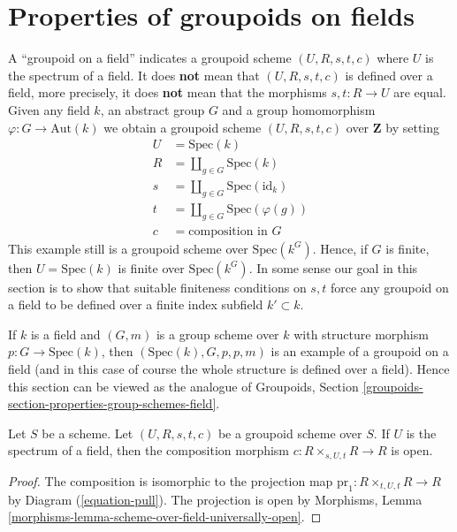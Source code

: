 \section{Properties of groupoids on fields}
\label{section-properties-groupoids-on-fields}

\noindent
A ``groupoid on a field'' indicates a groupoid scheme $(U, R, s, t, c)$
where $U$ is the spectrum of a field. It does {\bf not} mean that
$(U, R, s, t, c)$ is defined over a field, more precisely, it does
{\bf not} mean that the morphisms $s, t : R \to U$ are equal.
Given any field $k$, an abstract group $G$ and a group homomorphism
$\varphi : G \to \text{Aut}(k)$ we obtain a groupoid scheme
$(U, R, s, t, c)$ over $\mathbf{Z}$ by setting
\begin{align*}
U & = \text{Spec}(k) \\
R & = \coprod\nolimits_{g \in G} \text{Spec}(k) \\
s & = \coprod\nolimits_{g \in G} \text{Spec}(\text{id}_k) \\
t & = \coprod\nolimits_{g \in G} \text{Spec}(\varphi(g)) \\
c & = \text{composition in }G
\end{align*}
This example still is a groupoid scheme over $\text{Spec}(k^G)$.
Hence, if $G$ is finite, then $U = \text{Spec}(k)$ is finite over
$\text{Spec}(k^G)$.
In some sense our goal in this section is to show that suitable
finiteness conditions on $s, t$ force any groupoid on a field
to be defined over a finite index subfield $k' \subset k$.

\medskip\noindent
If $k$ is a field and $(G, m)$ is a group scheme over $k$ with structure
morphism $p : G \to \text{Spec}(k)$, then $(\text{Spec}(k), G, p, p, m)$
is an example of a groupoid on a field (and in this case of course the whole
structure is defined over a field). Hence this section can be viewed as the
analogue of
Groupoids, Section \ref{groupoids-section-properties-group-schemes-field}.

\begin{lemma}
\label{lemma-groupoid-on-field-open-multiplication}
Let $S$ be a scheme. Let $(U, R, s, t, c)$ be a groupoid scheme
over $S$. If $U$ is the spectrum of a field, then the composition
morphism $c : R \times_{s, U, t} R \to R$ is open.
\end{lemma}

\begin{proof}
The composition is isomorphic to the projection map
$\text{pr}_1 : R \times_{t, U, t} R \to R$ by
Diagram (\ref{equation-pull}).
The projection is open by
Morphisms, Lemma \ref{morphisms-lemma-scheme-over-field-universally-open}.
\end{proof}

